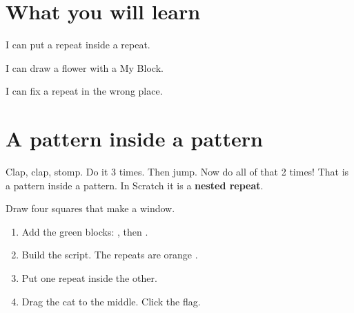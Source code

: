 
\section{What you will learn}
\begin{ican}
  \item I can put a repeat inside a repeat.
  \item I can draw a flower with a My Block.
  \item I can fix a repeat in the wrong place.
\end{ican}

\section{A pattern inside a pattern}
Clap, clap, stomp. Do it 3 times. Then jump. Now do all of that 2 times! That is a pattern inside a pattern. In Scratch it is a \textbf{nested repeat}.

\begin{exercise}
Draw four squares that make a window.
\begin{enumerate}[leftmargin=1.4em,itemsep=2pt]
  \item Add the green  blocks: , then .
  \item Build the script. The repeats are orange .
  \item Put one repeat inside the other.
  \item Drag the cat to the middle. Click the flag.
\end{enumerate}
\begin{center}
\begin{scratch}[scale=0.8]
\end{scratch}
\end{center}
\end{exercise}

